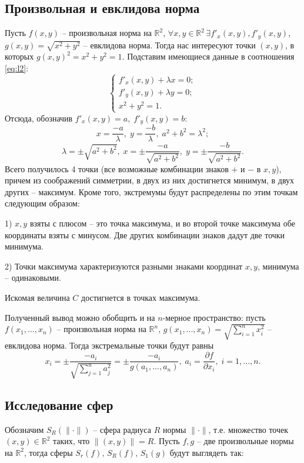 \documentclass{article}
\begin{document}
\subsection{Произвольная и евклидова норма}
Пусть $f(x,y)$ -- произвольная норма на $\mathbb{R}^2$, $\forall{x,y \in \mathbb{R}^2} \,\exists{f'_x(x,y), f'_y(x,y)}$, \newline $g(x,y) = \sqrt{x^2+y^2} $ -- евклидова норма. Тогда нас интересуют точки $(x,y)$, в которых $g(x,y)^2 = x^2 + y^2 = 1$. Подставим имеющиеся данные в соотношения \eqref{eq:l2}:
\begin{equation*}
	\begin{cases}
		f'_x(x,y) + \lambda x = 0; \\
		f'_y(x,y) + \lambda y = 0; \\
		x^2 + y^2 = 1.
	\end{cases}
\end{equation*}
Отсюда, обозначив $f'_x(x,y) = a, \; f'_y(x,y) = b$:
$$ x = \frac{-a}{\lambda}, \; y = \frac{-b}{\lambda}, \; a^2 + b^2 = \lambda^2; $$
$$ \lambda = \pm \sqrt{a^2+b^2}, \; x = \pm\frac{-a}{\sqrt{a^2+b^2}}, \; y = \pm\frac{-b}{\sqrt{a^2+b^2}}. $$
Всего получилось 4 точки (все возможные комбинации знаков $+$ и $-$ в $x,y$), причем из соображений симметрии, в двух из них достигнется минимум, в двух других -- максимум. Кроме того, экстремумы будут распределены по этим точкам следующим образом:
 
\vspace{1mm}
1) $x, y$ взяты с плюсом -- это точка максимума, и во второй точке максимума обе координаты взяты с минусом. Две других комбинации знаков дадут две точки минимума.

2) Точки максимума характеризуются разными знаками координат $x,y$, минимума -- одинаковыми.

\vspace{1mm}
Искомая величина $C$ достигнется в точках максимума.

Полученный вывод можно обобщить и на $n$-мерное пространство: пусть $f(x_1,...,x_n)$ -- произвольная норма на $\mathbb{R}^n$, $g(x_1,...,x_n) =  \sqrt{\sum\limits_{i=1}^n{x_i^2}}$ -- евклидова норма. Тогда экстремальные точки будут равны
$$ x_i = \pm \frac{-a_i}{\sqrt{\sum\limits_{j=1}^n{a_j^2}}} = \pm \frac{-a_i}{g(a_1,...,a_n)}, \; a_i = \frac{\partial f}{\partial x_i}, \; i=1,...,n. $$

\subsection{Исследование сфер} \label{3.3}
Обозначим $S_R(\|\cdot\|)$ -- сфера радиуса $R$ нормы $\|\cdot\|$, т.е. множество точек $(x,y) \in \mathbb{R}^2$ таких, что $\|(x,y)\| = R$. Пусть $f,g$ -- две произвольные нормы на $\mathbb{R}^2$, тогда сферы $S_r(f), \, S_R(f), \, S_1(g)$ будут выглядеть так:
\end{document}
